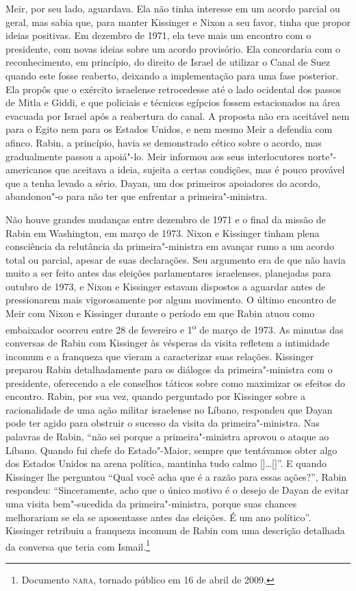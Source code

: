Meir, por seu lado, aguardava. Ela não tinha interesse em um acordo
parcial ou geral, mas sabia que, para manter Kissinger e Nixon a seu
favor, tinha que propor ideias positivas. Em dezembro de 1971, ela teve
mais um encontro com o presidente, com novas ideias sobre um acordo
provisório. Ela concordaria com o reconhecimento, em princípio, do
direito de Israel de utilizar o Canal de Suez quando este fosse
reaberto, deixando a implementação para uma fase posterior. Ela propôs
que o exército israelense retrocedesse até o lado ocidental dos passos
de Mitla e Giddi, e que policiais e técnicos egípcios fossem estacionados
na área evacuada por Israel após a reabertura do canal. A proposta não
era aceitável nem para o Egito nem para os Estados Unidos, e nem mesmo Meir a
defendia com afinco. Rabin, a princípio, havia se demonstrado cético sobre
o acordo, mas gradualmente passou a apoiá"-lo. Meir informou aos seus
interlocutores norte"-americanos que aceitava a ideia, sujeita a certas
condições, mas é pouco provável que a tenha levado a sério. Dayan,
um dos primeiros apoiadores do acordo, abandonou"-o para não ter que
enfrentar a primeira"-ministra.

Não houve grandes mudanças entre dezembro de 1971 e o final da missão de
Rabin em Washington, em março de 1973. Nixon e Kissinger tinham plena
consciência da relutância da primeira"-ministra em avançar rumo a um
acordo total ou parcial, apesar de suas declarações. Seu argumento era
de que não havia muito a ser feito antes das eleições parlamentares
israelenses, planejadas para outubro de 1973, e Nixon e Kissinger estavam
dispostos a aguardar antes de pressionarem mais vigorosamente por algum
movimento. O último encontro de Meir com Nixon e Kissinger durante o
período em que Rabin atuou como embaixador ocorreu entre 28 de fevereiro e
1\textsuperscript{o} de março de 1973. As minutas das conversas de
Rabin com Kissinger às vésperas da visita refletem a intimidade incomum
e a franqueza que vieram a caracterizar suas relações. Kissinger
preparou Rabin detalhadamente para os diálogos da primeira"-ministra com
o presidente, oferecendo a ele conselhos táticos sobre como maximizar os
efeitos do encontro. Rabin, por sua vez, quando perguntado por Kissinger
sobre a racionalidade de uma ação militar israelense no Líbano,
respondeu que Dayan pode ter agido para obstruir o sucesso da visita da
primeira"-ministra. Nas palavras de Rabin, ``não sei porque a primeira"-ministra
aprovou o ataque ao Líbano. Quando fui chefe do Estado"-Maior,
sempre que tentávamos obter algo dos Estados Unidos na arena política,
mantinha tudo calmo [{]\ldots{}[}]''. E quando Kissinger lhe perguntou ``Qual você
acha que é a razão para essas ações?'', Rabin respondeu:
``Sinceramente, acho que o único motivo é o desejo de Dayan de evitar
uma visita bem"-sucedida da primeira"-ministra, porque suas chances
melhorariam se ela se aposentasse antes das eleições. É um ano
político''. Kissinger retribuiu a franqueza incomum de Rabin com uma
descrição detalhada da conversa que teria com Ismail.\footnote{Documento \textsc{nara}, tornado público em 16 de abril de 2009.}

